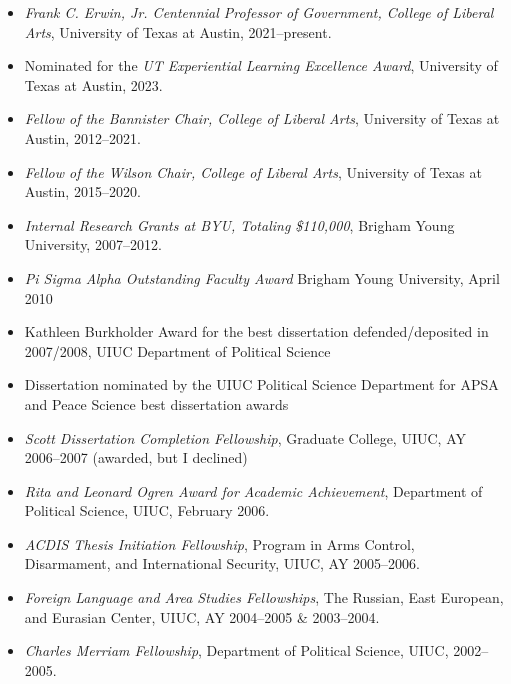 \documentclass[10pt]{article}
\begin{document}
\begin{itemize}\setlength{\itemsep}{1pt}

\item \emph{Frank C. Erwin, Jr. Centennial Professor of Government, College of Liberal Arts}, University of Texas at Austin, 2021--present.

\item Nominated for the \emph{UT Experiential Learning Excellence Award}, University of Texas at Austin, 2023.

\item \emph{Fellow of the Bannister Chair, College of Liberal Arts}, University of Texas at Austin, 2012--2021.

\item \emph{Fellow of the Wilson Chair, College of Liberal Arts}, University of Texas at Austin, 2015--2020.

\item \emph{Internal Research Grants at BYU, Totaling \$110,000}, Brigham Young University, 2007--2012.

\item \textit{Pi Sigma Alpha Outstanding Faculty Award} Brigham Young University, April 2010

\item Kathleen Burkholder Award for the best dissertation defended/deposited in 2007/2008, UIUC Department of Political Science

\item Dissertation nominated by the UIUC Political Science Department for APSA and Peace Science best dissertation awards

\item \emph{Scott Dissertation Completion Fellowship}, Graduate College, UIUC, AY
2006--2007 (awarded, but I declined)

\item \emph{Rita and Leonard Ogren Award for Academic Achievement}, Department of Political
Science, UIUC, February 2006.

\item \emph{ACDIS Thesis Initiation Fellowship}, Program in Arms Control, Disarmament, and International
Security, UIUC, AY 2005--2006.

\item \emph{Foreign Language and Area Studies Fellowships}, The Russian, East European, and Eurasian
Center, UIUC, AY 2004--2005 \& 2003--2004.

\item \emph{Charles Merriam Fellowship}, Department of Political Science, UIUC, 2002--2005.

\end{itemize}
\end{document}
